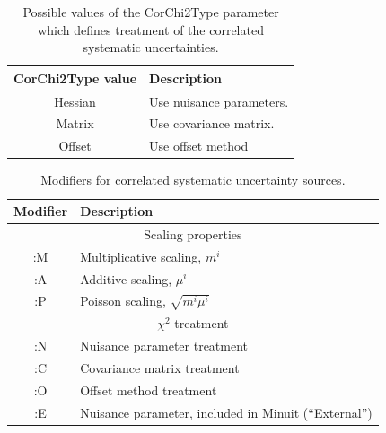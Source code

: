 \begin{table}
\begin{center}
\begin{tabular}{cl}
\hline
    {\sc CorChi2Type} value &  Description \\
\hline
  {\sc Hessian}             & Use nuisance parameters.\\
  {\sc Matrix }             & Use covariance matrix. \\
  {\sc Offset }             & Use offset method\\
\hline
\end{tabular}
\end{center}
\caption{\label{tab:Chi2Type}Possible values of the {\sc CorChi2Type} parameter which defines treatment of the correlated systematic uncertainties.}
\end{table}
 
\begin{table}
\begin{center}
\begin{tabular}{cl}
\hline
  Modifier &  Description \\
\hline
   \multicolumn{2}{c}{Scaling properties}\\
  {\sc :M}  &  Multiplicative scaling, $ m^i$ \\
  {\sc :A}  &  Additive scaling, $ \mu^i$ \\
  {\sc :P}  &  Poisson scaling, $ \sqrt{m^i\mu^i}$ \\
   \multicolumn{2}{c}{$\chi^2$ treatment}\\
  {\sc :N}  &  Nuisance parameter treatment \\
  {\sc :C}  &  Covariance matrix treatment \\
  {\sc :O}  &  Offset method treatment \\
  {\sc :E}  &  Nuisance parameter, included in {\sc Minuit} (``External'')\\
\hline
\end{tabular}
\end{center}
\caption{\label{tab:SystModifier}Modifiers for correlated systematic
uncertainty sources.}
\end{table}

